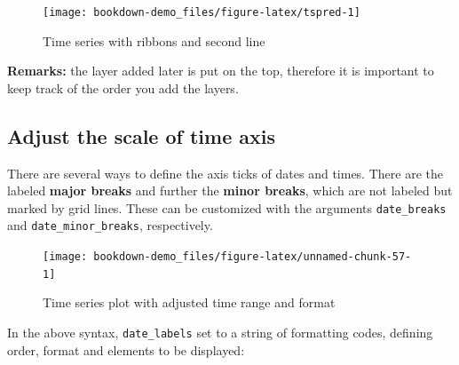 \documentclass[]{book}
\newenvironment{Shaded}{\begin{snugshade}}{\end{snugshade}}
\newcommand{\KeywordTok}[1]{\textcolor[rgb]{0.13,0.29,0.53}{\textbf{#1}}}
\newcommand{\DataTypeTok}[1]{\textcolor[rgb]{0.13,0.29,0.53}{#1}}
\newcommand{\StringTok}[1]{\textcolor[rgb]{0.31,0.60,0.02}{#1}}
\newcommand{\CommentTok}[1]{\textcolor[rgb]{0.56,0.35,0.01}{\textit{#1}}}
\newcommand{\OperatorTok}[1]{\textcolor[rgb]{0.81,0.36,0.00}{\textbf{#1}}}
\newcommand{\NormalTok}[1]{#1}
\begin{document}
\begin{figure}

{\centering \texttt{[image: bookdown-demo\_files/figure-latex/tspred-1]} 

}

\caption{Time series with ribbons and second line}\label{fig:tspred}
\end{figure}

\textbf{Remarks:} the layer added later is put on the top, therefore it
is important to keep track of the order you add the layers.

\subsection{Adjust the scale of time
axis}\label{adjust-the-scale-of-time-axis}

There are several ways to define the axis ticks of dates and times.
There are the labeled \textbf{major breaks} and further the
\textbf{minor breaks}, which are not labeled but marked by grid lines.
These can be customized with the arguments \texttt{date\_breaks} and
\texttt{date\_minor\_breaks}, respectively.

\begin{Shaded}
\end{Shaded}

\begin{figure}

{\centering \texttt{[image: bookdown-demo\_files/figure-latex/unnamed-chunk-57-1]} 

}

\caption{Time series plot with adjusted time range and format}\label{fig:unnamed-chunk-57}
\end{figure}

In the above syntax, \texttt{date\_labels} set to a string of formatting
codes, defining order, format and elements to be displayed:
\end{document}
